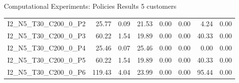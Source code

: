 \documentclass{beamer} %
\theoremstyle{definition} %
\begin{document}
\begin{frame}{Computational Experiments: Policies Results 5 customers}
\begin{table}[]
{\begin{tabular}{lrrrrrrr}
				I2\_N5\_T30\_C200\_0\_P2 & 25.77   & 0.09  & 21.53 & 0.00  & 0.00 & 4.24    & 0.00   \\
				I2\_N5\_T30\_C200\_0\_P3 & 60.22   & 1.54  & 19.89 & 0.00  & 0.00 & 40.33   & 0.00   \\
				I2\_N5\_T30\_C200\_0\_P4 & 25.46   & 0.07  & 25.46 & 0.00  & 0.00 & 0.00    & 0.00   \\
				I2\_N5\_T30\_C200\_0\_P5 & 60.22   & 1.54  & 19.89 & 0.00  & 0.00 & 40.33   & 0.00   \\
				I2\_N5\_T30\_C200\_0\_P6 & 119.43  & 4.04  & 23.99 & 0.00  & 0.00 & 95.44   & 0.00  \\  
				\hline 
			\end{tabular}
		}
	\end{table}
\end{frame}
\end{document}
